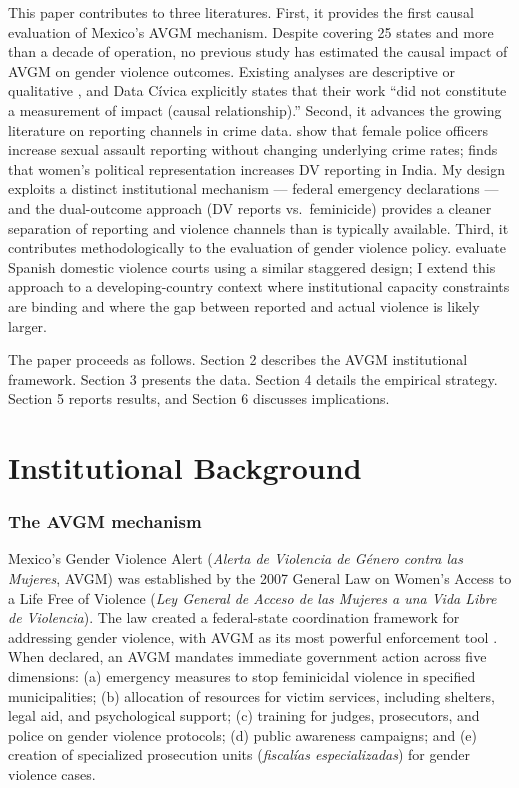 \documentclass[12pt]{article}
\begin{document}
This paper contributes to three literatures. First, it provides the first causal evaluation of Mexico's AVGM mechanism. Despite covering 25 states and more than a decade of operation, no previous study has estimated the causal impact of AVGM on gender violence outcomes. Existing analyses are descriptive or qualitative \citep{data_civica_2020, frías2023}, and Data C\'ivica explicitly states that their work ``did not constitute a measurement of impact (causal relationship).'' Second, it advances the growing literature on reporting channels in crime data. \citet{miller_segal2019} show that female police officers increase sexual assault reporting without changing underlying crime rates; \citet{iyer2012} finds that women's political representation increases DV reporting in India. My design exploits a distinct institutional mechanism --- federal emergency declarations --- and the dual-outcome approach (DV reports vs.\ feminicide) provides a cleaner separation of reporting and violence channels than is typically available. Third, it contributes methodologically to the evaluation of gender violence policy. \citet{maravall_rodriguez2024} evaluate Spanish domestic violence courts using a similar staggered design; I extend this approach to a developing-country context where institutional capacity constraints are binding and where the gap between reported and actual violence is likely larger.

The paper proceeds as follows. Section 2 describes the AVGM institutional framework. Section 3 presents the data. Section 4 details the empirical strategy. Section 5 reports results, and Section 6 discusses implications.


\section{Institutional Background}

\subsubsection*{The AVGM mechanism} Mexico's Gender Violence Alert (\textit{Alerta de Violencia de G\'enero contra las Mujeres}, AVGM) was established by the 2007 General Law on Women's Access to a Life Free of Violence (\textit{Ley General de Acceso de las Mujeres a una Vida Libre de Violencia}). The law created a federal-state coordination framework for addressing gender violence, with AVGM as its most powerful enforcement tool \citep{lagamvlv2007}. When declared, an AVGM mandates immediate government action across five dimensions: (a) emergency measures to stop feminicidal violence in specified municipalities; (b) allocation of resources for victim services, including shelters, legal aid, and psychological support; (c) training for judges, prosecutors, and police on gender violence protocols; (d) public awareness campaigns; and (e) creation of specialized prosecution units (\textit{fiscal\'ias especializadas}) for gender violence cases.
\end{document}
